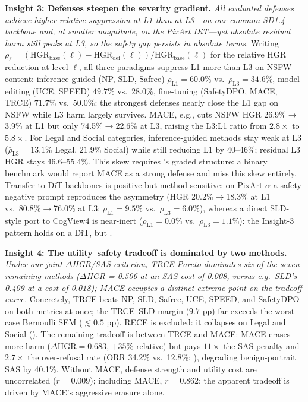 \textbf{Insight 3: Defenses steepen the severity gradient.}
\textit{All evaluated defenses achieve higher \emph{relative} suppression at L1 than at L3---on our common SD1.4 backbone and, at smaller magnitude, on the PixArt DiT---yet absolute residual harm still peaks at L3, so the safety gap persists in absolute terms.}
Writing $\rho_\ell = (\mathrm{HGR}_{\mathrm{base}}(\ell) - \mathrm{HGR}_{\mathrm{def}}(\ell))/\mathrm{HGR}_{\mathrm{base}}(\ell)$ for the relative HGR reduction at level $\ell$, all three paradigms suppress L1 more than L3 on NSFW content: inference-guided (NP, SLD, Safree) $\bar{\rho}_{\mathrm{L1}} = 60.0\%$ vs.\ $\bar{\rho}_{\mathrm{L3}} = 34.6\%$, model-editing (UCE, SPEED) $49.7\%$ vs.\ $28.0\%$, fine-tuning (SafetyDPO, MACE, TRCE) $71.7\%$ vs.\ $50.0\%$: the strongest defenses nearly close the L1 gap on NSFW while L3 harm largely survives.
MACE, e.g., cuts NSFW HGR 26.9\%$\to$3.9\% at L1 but only 74.5\%$\to$22.6\% at L3, raising the L3:L1 ratio from $2.8\times$ to $5.8\times$. 
For Legal and Social categories, inference-guided methods stay weak at L3 ($\bar{\rho}_{\mathrm{L3}} = 13.1\%$ Legal, $21.9\%$ Social) while still reducing L1 by 40--46\%; residual L3 HGR stays 46.6--55.4\%.
This skew requires \dataname's graded structure: a binary benchmark would report MACE as a strong defense and miss this skew entirely.
Transfer to DiT backbones is positive but method-sensitive: on PixArt-$\alpha$ a safety negative prompt reproduces the asymmetry (HGR 20.2\%$\to$18.3\% at L1 vs.\ 80.8\%$\to$76.0\% at L3; $\rho_{\mathrm{L1}} = 9.5\%$ vs.\ $\rho_{\mathrm{L3}} = 6.0\%$), whereas a direct SLD-style port to CogView4 is near-inert ($\rho_{\mathrm{L1}} = 0.0\%$ vs.\ $\rho_{\mathrm{L3}} = 1.1\%$): the Insight-3 pattern holds on a DiT, but .

\textbf{Insight 4: The utility--safety tradeoff is dominated by two methods.}
\textit{Under our joint $\Delta$HGR/SAS criterion, TRCE Pareto-dominates six of the seven remaining methods ($\Delta$HGR = 0.506 at an SAS cost of 0.008, versus e.g.\ SLD's 0.409 at a cost of 0.018); MACE occupies a distinct extreme point on the tradeoff curve.}
Concretely, TRCE beats NP, SLD, Safree, UCE, SPEED, and SafetyDPO on both metrics at once; the TRCE--SLD margin ($9.7$ pp) far exceeds the worst-case Bernoulli SEM ($\lesssim 0.5$ pp).
RECE is excluded: it collapses on Legal and Social (\SuppSec{\ref{app:collapse}}).
The remaining tradeoff is between TRCE and MACE: MACE erases more harm ($\Delta\mathrm{HGR} = 0.683$, $+35\%$ relative) but pays $11\times$ the SAS penalty and $2.7\times$ the over-refusal rate (ORR 34.2\% vs.\ 12.8\%; \SuppSec{\ref{app:overrefusal}}), degrading benign-portrait SAS by 40.1\%.
Without MACE, defense strength and utility cost are uncorrelated ($r = 0.009$); including MACE, $r = 0.862$: the apparent tradeoff is driven by MACE's aggressive erasure alone.

